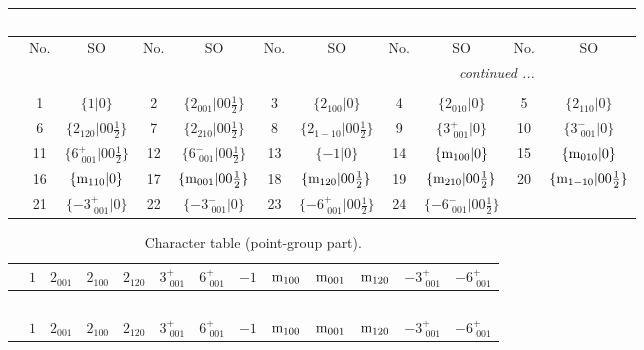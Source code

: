 \documentclass[fleqn,10pt,landscape]{article}
\begin{document}
\begin{itemize}
\begin{center}
\begin{longtable}{c|cc|cc|cc|cc|cc}
\multicolumn{10}{l}{\tablename\ \thetable{}} \\
 \hline \hline
 & No. & SO & No. & SO & No. & SO & No. & SO & No. & SO \\ \hline \endhead

 \hline \hline
\multicolumn{10}{r}{\footnotesize\it continued ...} \\ \endfoot

 \hline \hline
\multicolumn{10}{r}{} \\ \endlastfoot

 & 1 & $\{1|0\}$ & 2 & $\{2{}_{001}|0 0 \frac{1}{2}\}$ & 3 & $\{2{}_{100}|0\}$ & 4 & $\{2{}_{010}|0\}$ & 5 & $\{2{}_{110}|0\}$ \\
& 6 & $\{2{}_{120}|0 0 \frac{1}{2}\}$ & 7 & $\{2{}_{210}|0 0 \frac{1}{2}\}$ & 8 & $\{2{}_{1-10}|0 0 \frac{1}{2}\}$ & 9 & $\{3^{+}_{\,\,001}|0\}$ & 10 & $\{3^{-}_{\,\,001}|0\}$ \\
& 11 & $\{6^{+}_{\,\,001}|0 0 \frac{1}{2}\}$ & 12 & $\{6^{-}_{\,\,001}|0 0 \frac{1}{2}\}$ & 13 & $\{-1|0\}$ & 14 & $\{{\rm m}_{100}|0\}$ & 15 & $\{{\rm m}_{010}|0\}$ \\
& 16 & $\{{\rm m}_{110}|0\}$ & 17 & $\{{\rm m}_{001}|0 0 \frac{1}{2}\}$ & 18 & $\{{\rm m}_{120}|0 0 \frac{1}{2}\}$ & 19 & $\{{\rm m}_{210}|0 0 \frac{1}{2}\}$ & 20 & $\{{\rm m}_{1-10}|0 0 \frac{1}{2}\}$ \\
& 21 & $\{-3^{+}_{\,\,001}|0\}$ & 22 & $\{-3^{-}_{\,\,001}|0\}$ & 23 & $\{-6^{+}_{\,\,001}|0 0 \frac{1}{2}\}$ & 24 & $\{-6^{-}_{\,\,001}|0 0 \frac{1}{2}\}$ &  &  \\
\end{longtable}
\end{center}
\begin{center}
\renewcommand{\arraystretch}{1.0}
\begin{longtable}{c|rrrrrrrrrrrr}
\caption{Character table (point-group part).}
 \\
 \hline \hline
 & $ 1 $ & $ 2{}_{001} $ & $ 2{}_{100} $ & $ 2{}_{120} $ & $ 3^{+}_{\,\,001} $ & $ 6^{+}_{\,\,001} $ & $ -1 $ & $ {\rm m}_{100} $ & $ {\rm m}_{001} $ & $ {\rm m}_{120} $ & $ -3^{+}_{\,\,001} $ & $ -6^{+}_{\,\,001} $ \\ \hline \endfirsthead

\multicolumn{12}{l}{\tablename\ \thetable{}} \\
 \hline \hline
 & $ 1 $ & $ 2{}_{001} $ & $ 2{}_{100} $ & $ 2{}_{120} $ & $ 3^{+}_{\,\,001} $ & $ 6^{+}_{\,\,001} $ & $ -1 $ & $ {\rm m}_{100} $ & $ {\rm m}_{001} $ & $ {\rm m}_{120} $ & $ -3^{+}_{\,\,001} $ & $ -6^{+}_{\,\,001} $ \\ \hline \endhead


\end{longtable}
\end{center}
\end{itemize}
\end{document}

